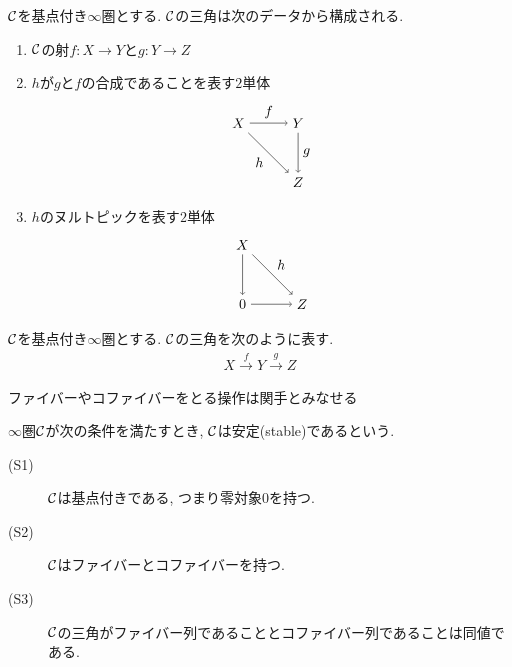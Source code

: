 \documentclass[uplatex, a4paper, 14Q, dvipdfmx]{jsarticle}
\begin{document}
\begin{remark}
  $\mathcal{C}$を基点付き$\infty$圏とする.
  $\mathcal{C}$の三角は次のデータから構成される.
  \begin{enumerate}
    \item $\mathcal{C}$の射$f : X \to Y$と$g : Y \to Z$
    \item $h$が$g$と$f$の合成であることを表す$2$単体
    \[
      \begin{tikzpicture}[auto,->]
        \node (Z) at (1.5,0) {$Z$};
        \node (X) at (0,1.5) {$X$};
        \node (Y) at (1.5,1.5) {$Y$};
        \draw (X) -- node{$f$} (Y);
        \draw (Y) -- node{$g$} (Z);
        \draw (X) -- node[swap]{$h$} (Z);
      \end{tikzpicture}
    \]
    \item $h$のヌルトピックを表す$2$単体
    \[
      \begin{tikzpicture}[auto,->]
        \node (0) at (0,0) {$0$};
        \node (Z) at (1.5,0) {$Z$};
        \node (X) at (0,1.5) {$X$};
        \draw (0) -- (Z);
        \draw (X) -- (0);
        \draw (X) -- node{$h$} (Z);
      \end{tikzpicture}
    \]
  \end{enumerate} 
\end{remark}

\begin{notation}
  $\mathcal{C}$を基点付き$\infty$圏とする.
  $\mathcal{C}$の三角を次のように表す. 
  \begin{align*}
    X \xrightarrow{f} Y \xrightarrow{g} Z
  \end{align*}
  
\end{notation}

ファイバーやコファイバーをとる操作は関手とみなせる

\begin{remark}
  
\end{remark}

\begin{lemma} \label{prop:cofib_is_left_adj_to_left_Kan_ext}
  
\end{lemma}

\begin{definition}[安定$\infty$圏]
  $\infty$圏$\mathcal{C}$が次の条件を満たすとき, $\mathcal{C}$は安定(stable)であるという. 
  \begin{description}
    \item[(S1)] $\mathcal{C}$は基点付きである, つまり零対象$0$を持つ. 
    \item[(S2)] $\mathcal{C}$はファイバーとコファイバーを持つ.
    \item[(S3)] $\mathcal{C}$の三角がファイバー列であることとコファイバー列であることは同値である.
  \end{description}
\end{definition}
\end{document}
